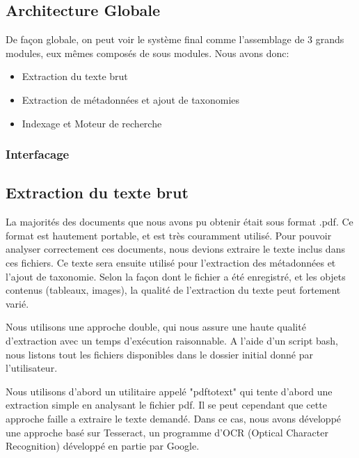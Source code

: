 

\subsection{Architecture Globale}
De façon globale, on peut voir le système final comme l'assemblage de 3 grands modules, eux mêmes composés de sous modules.
Nous avons donc:
\begin{itemize}
	\item Extraction du texte brut
	\item Extraction de métadonnées et ajout de taxonomies
	\item Indexage et Moteur de recherche
\end{itemize}

\subsubsection{Interfacage}

\subsection{Extraction du texte brut}
La majorités des documents que nous avons pu obtenir était sous format .pdf.
Ce format est hautement portable, et est très couramment utilisé.
Pour pouvoir analyser correctement ces documents, nous devions extraire le texte inclus dans ces fichiers.
Ce texte sera ensuite utilisé pour l'extraction des métadonnées et l'ajout de taxonomie. Selon la façon dont le fichier a été enregistré, et les objets contenus (tableaux, images), la qualité de l'extraction du texte peut fortement varié. 

Nous utilisons une approche double, qui nous assure une haute qualité d'extraction avec un temps d'exécution raisonnable.
A l'aide d'un script bash, nous listons tout les fichiers disponibles dans le dossier initial donné par l'utilisateur. 

Nous utilisons d'abord un utilitaire appelé "pdftotext" qui tente d'abord une extraction simple en analysant le fichier pdf.
Il se peut cependant que cette approche faille a extraire le texte demandé.
Dans ce cas, nous avons développé une approche basé sur Tesseract, un programme d'OCR (Optical Character Recognition) développé en partie par Google. 

